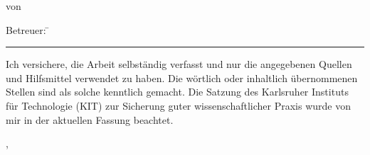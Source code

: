 \begin{titlepage}
{\begin{flushleft}
	\vspace{2cm}\hspace*{-1.7cm}						%
	\parbox[t][3cm][t]{13.5cm}
		{
			\LARGE	
			\centerline{\doctype}
			\centerline{von}
			\centerline{\bfseries\docauthor}
		} 		
\end{flushleft}
	\ifthenelse{\equal{\betreuerII}{}}
	{
		\vspace*{2cm}\hspace*{-1.7cm}
	}
	{
		\vspace*{2cm}\vspace*{-\baselineskip}\hspace*{-1.7cm}
	}
	\parbox[t][1cm][t]{13.5cm}
	{
		\ifthenelse{\equal{\betreuerII}{}}
		{
		}
		{
		\begin{tabbing}
			\Large\sffamily Betreuer: \= \Large\sffamily\bfseries\betreuerI\\
			\> \Large\sffamily\bfseries\betreuerII
		\end{tabbing}
		\vspace*{-\baselineskip}
		}
		\vspace*{0.5cm}
		\hrule
		\vspace*{0.5cm}
		\leftline{\Large\sffamily \monthword{\month}~\the\year}																		
	}
}
\cleardoublepage

\pagestyle{empty}
\vspace*{0.1cm}
Ich versichere, die Arbeit selbständig verfasst und nur die angegebenen Quellen und Hilfsmittel verwendet zu haben. Die wörtlich oder inhaltlich übernommenen Stellen sind als solche kenntlich gemacht. Die Satzung des Karlsruher Instituts für Technologie (KIT) zur Sicherung guter wissenschaftlicher Praxis wurde von mir in der aktuellen Fassung beachtet.
\vspace*{3cm}
\begin{center}
\doclocation, \docdate
\end{center}
\cleardoublepage
\end{titlepage}
